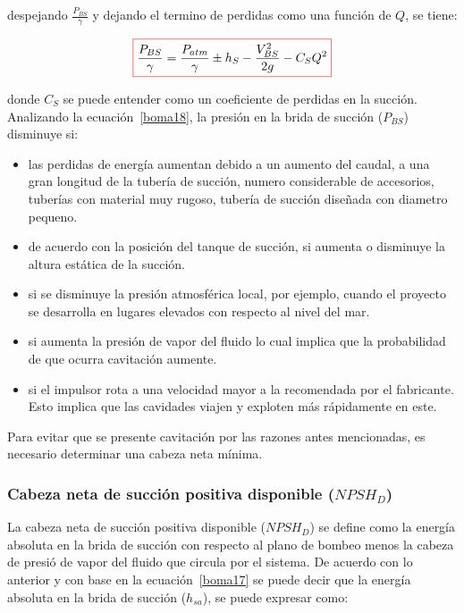 \documentclass[11pt, oneside]{article}
\begin{document}
despejando $\frac{P_{BS}}{\gamma}$ y dejando el termino de perdidas como una funci\'on de $Q$, se tiene:

\begin{equation}
\color{red}\boxed{\color{black} \frac{P_{BS}}{\gamma} = \frac{P_{atm}}{\gamma} \pm h_S - \frac{V_{BS}^2}{2g} - C_S Q^2 }
\label{boma18}
\end{equation}

donde $C_S$ se puede entender como un coeficiente de perdidas en la succi\'on. Analizando la ecuaci\'on~\ref{boma18}, la presi\'on en la brida de succi\'on ($P_{BS}$) disminuye si:
\begin{itemize}
\item las perdidas de energ\'ia aumentan debido a un aumento del caudal, a una gran longitud de la tuber\'ia de succi\'on, numero considerable de accesorios, tuber\'ias con material muy rugoso, tuber\'ia de succi\'on dise\~nada con diametro pequeno.
\item de acuerdo con la posici\'on del tanque de succi\'on, si aumenta o disminuye la altura est\'atica de la succi\'on.
\item si se disminuye la presi\'on atmosf\'erica  local, por ejemplo, cuando el proyecto se desarrolla en lugares elevados con respecto al nivel del mar. 
\item si aumenta la presi\'on de vapor del fluido lo cual implica que la probabilidad de que ocurra cavitaci\'on aumente. 
\item si el impulsor rota a una velocidad mayor a la recomendada por el fabricante. Esto implica que las cavidades viajen y exploten m\'as r\'apidamente en este.  
\end{itemize}

Para evitar que se presente cavitaci\'on por las razones antes mencionadas, es necesario determinar una cabeza neta m\'inima.

\subsubsection*{Cabeza neta de succi\'on positiva disponible ($NPSH_D$)}
La cabeza neta de succi\'on positiva disponible ($NPSH_D$) se define como la energ\'ia absoluta en la brida de succi\'on con respecto al plano de bombeo menos la cabeza de presi\'o de vapor del fluido que circula por el sistema. De acuerdo con lo anterior y con base en la ecuaci\'on~\ref{boma17} se puede decir que la energ\'ia absoluta en la brida de succi\'on ($h_{sa}$), se puede expresar como:
\end{document}
